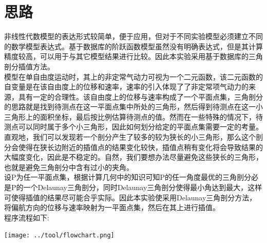 \documentclass[UTF8]{ctexart}
\begin{document}
\section{思路}
非线性代数模型的表达形式较简单，便于应用，但对于不同实验模型必须建立不同的数学模型表达式。基于数据库的阶跃函数模型虽然没有明确表达式，但是其计算精度较高，可以用于与其它模型结果进行比较\cite{shizhiwei1}。因此本实验采用基于数据库的三角剖分插值方法。\medskip \\
\indent 模型在单自由度运动时，其上的非定常气动力可视为一个二元函数，该二元函数的自变量是在该自由度上的位移和速率，速率的引入体现了了非定常项气动力的来源，具有一定的合理性。该自由度上的位移与速率构成了一个平面点集，三角剖分的思路就是找到待测点在这一平面点集中所处的三角形，然后得到待测点在这一小三角形上的面积坐标，最后按比例估算待测点的值。然而在一些特殊的情况下，待测点可以同时属于多个小三角形，因此如何划分给定的平面点集需要一定的考量。\medskip \\
\indent 直观地，我们可以发现若一个剖分产生了较多的较为狭长的小三角形，那么这个剖分会使得在狭长边附近的插值点的结果变化较快，插值点稍有变化将会导致结果的大幅度变化，因此是不稳定的。自然，我们要想办法尽量避免这些狭长的三角形，也就是避免三角剖分中含有过小的夹角。\medskip \\
\indent 设P为任一平面点集，根据计算几何中的知识可知P的任一角度最优的三角剖分必是P的一个Delaunay三角剖分，同时Delaunay三角剖分使得最小角达到最大，这样可使得插值的结果尽可能合乎实际。因此本实验使采用Delaunay三角剖分方法，将偏航方向的位移与速率映射为一平面点集，然后在其上进行插值。\medskip \\
\indent 程序流程如下:\\
\begin{center}
\texttt{[image: ../tool/flowchart.png]}
\end{center}
\end{document}
